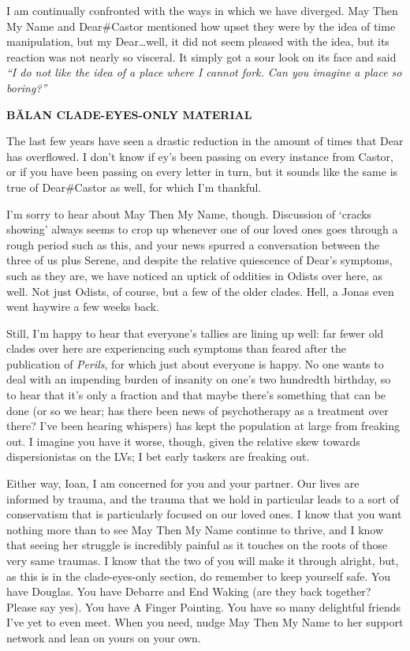 I am continually confronted with the ways in which we have diverged. May Then My Name and Dear\#Castor mentioned how upset they were by the idea of time manipulation, but my Dear\ldots well, it did not seem pleased with the idea, but its reaction was not nearly so visceral. It simply got a sour look on its face and said \emph{``I do not like the idea of a place where I cannot fork. Can you imagine a place so boring?''}

\textbf{BĂLAN CLADE-EYES-ONLY MATERIAL}

The last few years have seen a drastic reduction in the amount of times that Dear has overflowed. I don't know if ey's been passing on every instance from Castor, or if you have been passing on every letter in turn, but it sounds like the same is true of Dear\#Castor as well, for which I'm thankful.

I'm sorry to hear about May Then My Name, though. Discussion of `cracks showing' always seems to crop up whenever one of our loved ones goes through a rough period such as this, and your news spurred a conversation between the three of us plus Serene, and despite the relative quiescence of Dear's symptoms, such as they are, we have noticed an uptick of oddities in Odists over here, as well. Not just Odists, of course, but a few of the older clades. Hell, a Jonas even went haywire a few weeks back.

Still, I'm happy to hear that everyone's tallies are lining up well: far fewer old clades over here are experiencing such symptoms than feared after the publication of \emph{Perils}, for which just about everyone is happy. No one wants to deal with an impending burden of insanity on one's two hundredth birthday, so to hear that it's only a fraction and that maybe there's something that can be done (or so we hear; has there been news of psychotherapy as a treatment over there? I've been hearing whispers) has kept the population at large from freaking out. I imagine you have it worse, though, given the relative skew towards dispersionistas on the LVs; I bet early taskers are freaking out.

Either way, Ioan, I am concerned for you and your partner. Our lives are informed by trauma, and the trauma that we hold in particular leads to a sort of conservatism that is particularly focused on our loved ones. I know that you want nothing more than to see May Then My Name continue to thrive, and I know that seeing her struggle is incredibly painful as it touches on the roots of those very same traumas. I know that the two of you will make it through alright, but, as this is in the clade-eyes-only section, do remember to keep yourself safe. You have Douglas. You have Debarre and End Waking (are they back together? Please say yes). You have A Finger Pointing. You have so many delightful friends I've yet to even meet. When you need, nudge May Then My Name to her support network and lean on yours on your own.

